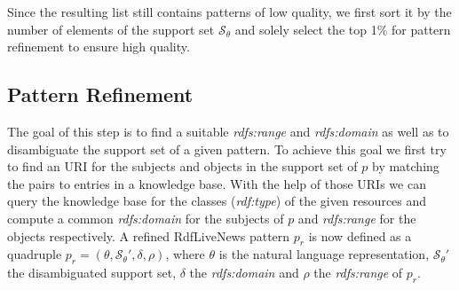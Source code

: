 \documentclass[a4paper]{llncs}
\newcommand{\NAME}{RdfLiveNews}
\begin{document}
Since the resulting list still contains patterns of low quality, we first sort it by the number of elements of the support set $\mathcal{S}_\theta$ and solely select the top 1\% for pattern refinement to ensure high quality.

\subsection{Pattern Refinement}
\label{subsec:pattern_refinement}%
The goal of this step is to find a suitable \emph{rdfs:range} and \emph{rdfs:domain} as well as to disambiguate the support set of a given pattern.
To achieve this goal we first try to find an URI for the subjects and objects in the support set of $p$ by matching the pairs to entries in a knowledge base.
With the help of those URIs we can query the knowledge base for the classes (\emph{rdf:type}) of the given resources and compute a common \emph{rdfs:domain} for the subjects of $p$ and \emph{rdfs:range} for the objects respectively. 
A refined \NAME{} pattern \texttt{$p_r$} is now defined as a quadruple $p_r = (\theta, \mathcal{S_\theta}', \delta, \rho)$, where $\theta$ is the natural language representation, $\mathcal{S_\theta}'$ the disambiguated support set, $\delta$ the \emph{rdfs:domain} and $\rho$ the \emph{rdfs:range} of $p_r$. 
\end{document}
